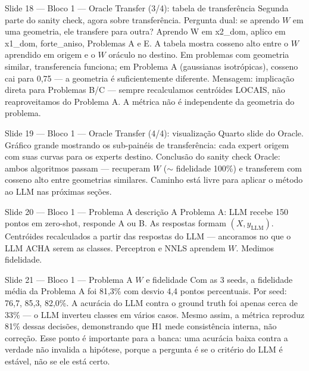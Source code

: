 \documentclass[aspectratio=169,10pt]{beamer}
\begin{document}
\begin{frame}{Slide 18 --- Bloco 1 --- Oracle Transfer (3/4): tabela de transfer\^encia}
\footnotesize
Segunda parte do sanity check, agora sobre transfer\^encia. Pergunta dual: se aprendo $W$ em uma geometria, ele transfere para outra? Aprendo W em x2\_dom, aplico em x1\_dom, forte\_aniso, Problemas A e E. A tabela mostra cosseno alto entre o $W$ aprendido em origem e o $W$ or\'aculo no destino. Em problemas com geometria similar, transferencia funciona; em Problema A (gaussianas isotr\'opicas), cosseno cai para 0,75 --- a geometria \'e suficientemente diferente. Mensagem: implica\c{c}\~ao direta para Problemas B/C --- sempre recalculamos centr\'oides LOCAIS, n\~ao reaproveitamos do Problema A. A m\'etrica n\~ao \'e independente da geometria do problema.
\end{frame}

\begin{frame}{Slide 19 --- Bloco 1 --- Oracle Transfer (4/4): visualiza\c{c}\~ao}
\footnotesize
Quarto slide do Oracle. Gr\'afico grande mostrando os sub-pain\'eis de transfer\^encia: cada expert origem com suas curvas para os experts destino. Conclus\~ao do sanity check Oracle: ambos algoritmos passam --- recuperam $W$ ($\sim$ fidelidade 100\%) e transferem com cosseno alto entre geometrias similares. Caminho est\'a livre para aplicar o m\'etodo ao LLM nas pr\'oximas se\c{c}\~oes.
\end{frame}

\begin{frame}{Slide 20 --- Bloco 1 --- Problema A descri\c{c}\~ao}
\footnotesize
A Problema A: LLM recebe 150 pontos em zero-shot, responde A ou B. As respostas formam $(X, y_{\text{LLM}})$. Centr\'oides recalculados a partir das respostas do LLM --- ancoramos no que o LLM ACHA serem as classes. Perceptron e NNLS aprendem $W$. Medimos fidelidade.
\end{frame}

\begin{frame}{Slide 21 --- Bloco 1 --- Problema A $W$ e fidelidade}
\footnotesize
Com as 3 seeds, a fidelidade m\'edia da Problema A foi 81{,}3\% com desvio 4{,}4 pontos percentuais. Por seed: 76{,}7, 85{,}3, 82{,}0\%. A acur\'acia do LLM contra o ground truth foi apenas cerca de 33\% --- o LLM inverteu classes em v\'arios casos. Mesmo assim, a m\'etrica reproduz 81\% dessas decis\~oes, demonstrando que H1 mede consist\^encia interna, n\~ao corre\c{c}\~ao. Esse ponto \'e importante para a banca: uma acur\'acia baixa contra a verdade n\~ao invalida a hip\'otese, porque a pergunta \'e se o crit\'erio do LLM \'e est\'avel, n\~ao se ele est\'a certo.
\end{frame}
\end{document}
